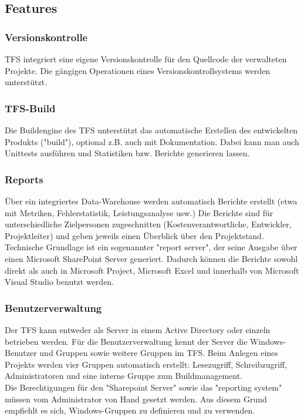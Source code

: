 \documentclass[10pt]{article}
\begin{document}
\subsection{Features}
\subsubsection{Versionskontrolle}
TFS integriert eine eigene Versionskontrolle für den Quellcode der verwalteten Projekte. Die gängigen Operationen eines Versionskontrollsystems werden unterstützt.
\subsubsection{TFS-Build}
Die Buildengine des TFS unterstützt das automatische Erstellen des entwickelten Produkts ("build"), optional z.B. auch mit Dokumentation. Dabei kann man auch Unittests ausführen und Statistiken bzw. Berichte generieren lassen.
\subsubsection{Reports}
Über ein integriertes Data-Warehouse werden automatisch Berichte erstellt (etwa mit Metriken, Fehlerstatistik, Leistungsanalyse usw.) Die Berichte sind für unterschiedliche Zielpersonen zugeschnitten (Kostenverantwortliche, Entwickler, Projektleiter) und geben jeweils einen Überblick über den Projektstand. Technische Grundlage ist ein sogenannter "report server", der seine Ausgabe über einen Microsoft SharePoint Server generiert. Dadurch können die Berichte sowohl direkt als auch in Microsoft Project, Microsoft Excel und innerhalb von Microsoft Visual Studio benutzt werden.
\subsubsection{Benutzerverwaltung}
Der TFS kann entweder als Server in einem Active Directory oder einzeln betrieben werden. Für die Benutzerverwaltung kennt der Server die Windows-Benutzer und Gruppen sowie weitere Gruppen im TFS. Beim Anlegen eines Projekts werden vier Gruppen automatisch erstellt: Lesezugriff, Schreibzugriff, Administratoren und eine interne Gruppe zum Buildmanagement. \\
Die Berechtigungen für den "Sharepoint Server" sowie das "reporting system" müssen vom Administrator von Hand gesetzt werden. Aus diesem Grund empfiehlt es sich, Windows-Gruppen zu definieren und zu verwenden.
\end{document}
